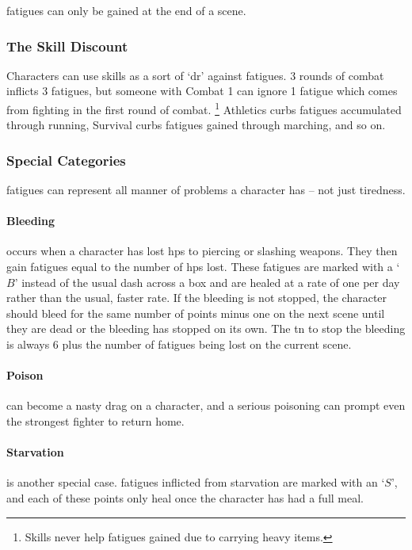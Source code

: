 \begin{multicols}{2}
{}{
	\Glspl{fatigue} can only be gained at the end of a scene.
}

\subsubsection{The Skill Discount}

Characters can use skills as a sort of `\gls{dr}' against \glspl{fatigue}.
3 \glspl{round} of combat inflicts 3 \glspl{fatigue}, but someone with Combat 1 can ignore 1 \gls{fatigue} which comes from fighting in the first round of combat.%
\footnote{Skills never help \glspl{fatigue} gained due to carrying heavy items.}
Athletics curbs \glspl{fatigue} accumulated through running, Survival curbs \glspl{fatigue} gained through marching, and so on.

\subsubsection{Special Categories}

\Glspl{fatigue} can represent all manner of problems a character has -- not just tiredness.

\paragraph{Bleeding} occurs when a character has lost \glspl{hp} to piercing or slashing weapons.
They then gain \glspl{fatigue} equal to the number of \glspl{hp} lost.
These \glspl{fatigue} are marked with a `$B$' instead of the usual dash across a box and are healed at a rate of one per day rather than the usual, faster rate.
If the bleeding is not stopped, the character should bleed for the same number of points minus one on the next scene until they are dead or the bleeding has stopped on its own.
The \gls{tn} to stop the bleeding is always 6 plus the number of \glspl{fatigue} being lost on the current scene.

\paragraph{Poison} can become a nasty drag on a character, and a serious poisoning can prompt even the strongest fighter to return home.

\paragraph{Starvation} is another special case.
\glspl{fatigue} inflicted from starvation are marked with an `$S$', and each of these points only heal once the character has had a full meal.


\end{multicols}
